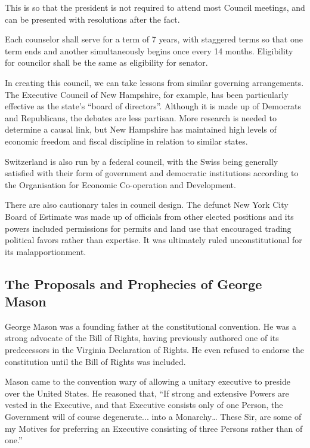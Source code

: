 \documentclass{article}
\newcommand{\quotes}[1]{``#1''}
\begin{document}
This is so that the president is not required to attend most Council meetings, and can be presented with resolutions after the fact.

\begin{quoting}
Each counselor shall serve for a term of 7 years, with staggered terms so that one term ends and another simultaneously begins once every 14 months. Eligibility for councilor shall be the same as eligibility for senator.
\end{quoting}

In creating this council, we can take lessons from similar governing arrangements\cite{Khanna}. The Executive Council of New Hampshire, for example, has been particularly effective as the state's \quotes{board of directors}\cite{Hahn-Burkett}. Although it is made up of Democrats and Republicans, the debates are less partisan\cite{Timmins}. More research is needed to determine a causal link, but New Hampshire has maintained high levels of economic freedom and fiscal discipline in relation to similar states\cite{Ruger}.

Switzerland is also run by a federal council, with the Swiss being generally satisfied with their form of government and democratic institutions according to the Organisation for Economic Co-operation and Development\cite{Kaufman}.

There are also cautionary tales in council design. The defunct New York City Board of Estimate was made up of officials from other elected positions and its powers included permissions for permits and land use that encouraged trading political favors rather than expertise\cite{Purnick}. It was ultimately ruled unconstitutional for its malapportionment\cite{Board_of_Estimate}.

\subsection{The Proposals and Prophecies of George Mason}

George Mason was a founding father at the constitutional convention. He was a strong advocate of the Bill of Rights, having previously authored one of its predecessors in the Virginia Declaration of Rights. He even refused to endorse the constitution until the Bill of Rights was included.

Mason came to the convention wary of allowing a unitary executive to preside over the United States. He reasoned that, \quotes{If strong and extensive Powers are vested in the Executive, and that Executive consists only of one Person, the Government will of course degenerate... into a Monarchy… These Sir, are some of my Motives for preferring an Executive consisting of three Persons rather than of one.}\cite{Mason}
\end{document}
